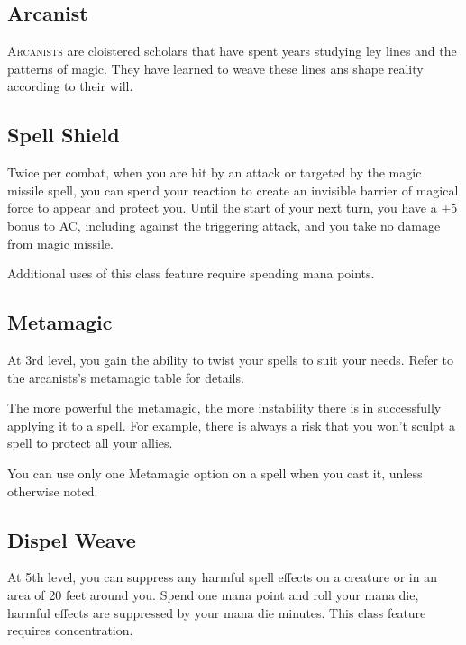 
\begin{multicols*}{2}

\section{Arcanist}

\lettrine[lines=3, lhang=0.15, loversize=0.25, findent=.5em]{A}{rcanists} are cloistered scholars that have spent years studying ley lines and the patterns of magic. They have learned to weave these lines ans shape reality according to their will. 

\subsection*{Spell Shield}

Twice per combat, when you are hit by an attack or targeted by the magic missile spell, you can spend your reaction to create an invisible barrier of magical force to appear and protect you. Until the start of your next turn, you have a +5 bonus to AC, including against the triggering attack, and you take no damage from magic missile.

Additional uses of this class feature require spending mana points.

\subsection*{Metamagic}

At 3rd level, you gain the ability to twist your spells to suit your needs. Refer to the arcanists's metamagic table for details.

The more powerful the metamagic, the more instability there is in successfully applying it to a spell. For example, there is always a risk that you won't sculpt a spell to protect all your allies.

You can use only one Metamagic option on a spell when you cast it, unless otherwise noted.


\subsection*{Dispel Weave}

At 5th level, you can suppress any harmful spell effects on a creature or in an area of 20 feet around you. Spend one mana point and roll your mana die, harmful effects are suppressed by your mana die minutes. This class feature requires concentration.


\end{multicols*}
